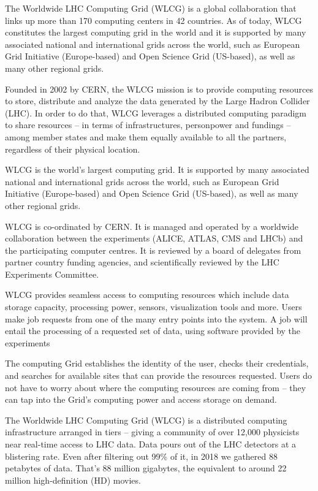 The Worldwide LHC Computing Grid (WLCG) is a global collaboration that links up more than 170 computing centers in 42 countries. 
As of today, WLCG constitutes the largest computing grid in the world and it is supported by many associated national and international grids across the world, such as European Grid Initiative (Europe-based) and Open Science Grid (US-based), as well as many other regional grids.

Founded in 2002 by CERN, the WLCG mission is to provide computing resources to store, distribute and analyze the data generated by the Large Hadron Collider (LHC).
In order to do that, WLCG leverages a distributed computing paradigm to share resources -- in terms of infrastructures, personpower and fundings -- among member states and make them equally available to all the partners, regardless of their physical location.

WLCG is the world's largest computing grid. It is supported by many associated national and international grids across the world, such as European Grid Initiative (Europe-based) and Open Science Grid (US-based), as well as many other regional grids.

WLCG is co-ordinated by CERN. It is managed and operated by a worldwide collaboration between the experiments (ALICE, ATLAS, CMS and LHCb) and the participating computer centres. It is reviewed by a board of delegates from partner country funding agencies, and scientifically reviewed by the LHC Experiments Committee.

WLCG provides seamless access to computing resources which include data storage capacity, processing power, sensors, visualization tools and more. Users make job requests from one of the many entry points into the system. A job will entail the processing of a requested set of data, using software provided by the experiments

The computing Grid establishes the identity of the user, checks their credentials, and searches for available sites that can provide the resources requested. Users do not have to worry about where the computing resources are coming from – they can tap into the Grid's computing power and access storage on demand.


The Worldwide LHC Computing Grid (WLCG) is a distributed computing infrastructure arranged in tiers – giving a community of over 12,000 physicists near real-time access to LHC data. Data pours out of the LHC detectors at a blistering rate. Even after filtering out 99\% of it, in 2018 we gathered 88 petabytes of data. That's 88 million gigabytes, the equivalent to around 22 million high-definition (HD) movies.

